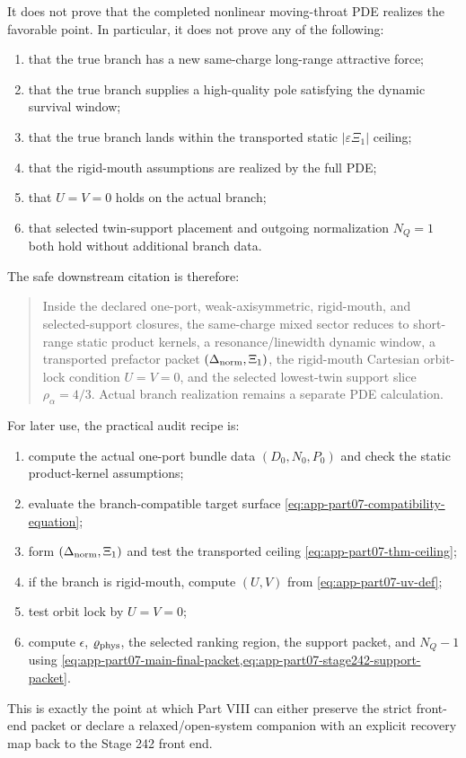 It does not prove that the completed nonlinear moving-throat PDE realizes the favorable point.  In particular, it does not prove any of the following:
\begin{enumerate}[leftmargin=2.2em]
  \item that the true branch has a new same-charge long-range attractive force;
  \item that the true branch supplies a high-quality pole satisfying the dynamic survival window;
  \item that the true branch lands within the transported static \(|\varepsilon\Xi_1|\) ceiling;
  \item that the rigid-mouth assumptions are realized by the full PDE;
  \item that \(U=V=0\) holds on the actual branch;
  \item that selected twin-support placement and outgoing normalization \(N_Q=1\) both hold without additional branch data.
\end{enumerate}

The safe downstream citation is therefore:
\begin{quote}
Inside the declared one-port, weak-axisymmetric, rigid-mouth, and selected-support closures, the same-charge mixed sector reduces to short-range static product kernels, a resonance/linewidth dynamic window, a transported prefactor packet \((\Delta_{\rm norm},\Xi_1)\), the rigid-mouth Cartesian orbit-lock condition \(U=V=0\), and the selected lowest-twin support slice \(\rho_\alpha=4/3\).  Actual branch realization remains a separate PDE calculation.
\end{quote}

For later use, the practical audit recipe is:
\begin{enumerate}[leftmargin=2.2em]
  \item compute the actual one-port bundle data \((D_0,N_0,P_0)\) and check the static product-kernel assumptions;
  \item evaluate the branch-compatible target surface \cref{eq:app-part07-compatibility-equation};
  \item form \((\Delta_{\rm norm},\Xi_1)\) and test the transported ceiling \cref{eq:app-part07-thm-ceiling};
  \item if the branch is rigid-mouth, compute \((U,V)\) from \cref{eq:app-part07-uv-def};
  \item test orbit lock by \(U=V=0\);
  \item compute \(\epsilon\), \(\varrho_{\rm phys}\), the selected ranking region, the support packet, and \(N_Q-1\) using \cref{eq:app-part07-main-final-packet,eq:app-part07-stage242-support-packet}.
\end{enumerate}
This is exactly the point at which Part VIII can either preserve the strict front-end packet or declare a relaxed/open-system companion with an explicit recovery map back to the Stage 242 front end.


